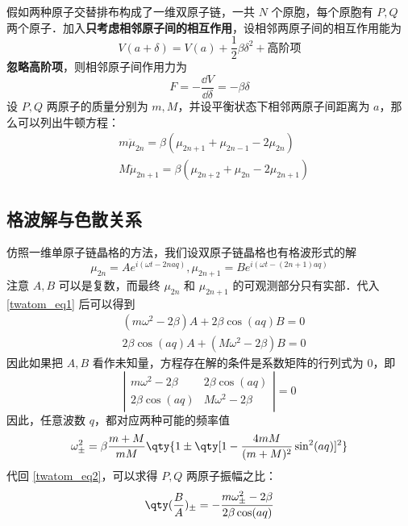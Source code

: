 
假如两种原子交替排布构成了一维双原子链，一共 $N$ 个原胞，每个原胞有 $P,Q$ 两个原子．加入\textbf{只考虑相邻原子间的相互作用}，设相邻两原子间的相互作用能为
\begin{equation}
V(a+\delta)=V(a)+\frac{1}{2}\beta \delta^2+\text{高阶项}
\end{equation}
\textbf{忽略高阶项}，则相邻原子间作用力为
\begin{equation}
F=-\frac{\dd V}{\dd \delta}=-\beta \delta
\end{equation}
设 $P,Q$ 两原子的质量分别为 $m,M$，并设平衡状态下相邻两原子间距离为 $a$，那么可以列出牛顿方程：
\begin{equation}\label{twatom_eq1}
\begin{aligned}
&m\ddot \mu_{2n}=\beta(\mu_{2n+1}+\mu_{2n-1}-2\mu_{2n})\\
&M\ddot \mu_{2n+1}=\beta(\mu_{2n+2}+\mu_{2n}-2\mu_{2n+1})
\end{aligned}
\end{equation}
\subsection{格波解与色散关系}
仿照一维单原子链晶格的方法，我们设双原子链晶格也有格波形式的解
\begin{equation}\label{twatom_eq3}
\mu_{2n}=A e^{i(\omega t - 2naq)},\mu_{2n+1}=B  e^{i(\omega t - (2n+1)aq)}
\end{equation}
注意 $A,B$ 可以是复数，而最终 $\mu_{2n}$ 和 $\mu_{2n+1}$ 的可观测部分只有实部．代入\autoref{twatom_eq1} 后可以得到
\begin{equation}\label{twatom_eq2}
\begin{aligned}
&(m\omega^2-2\beta)A+2\beta\cos(aq)B=0\\
&2\beta\cos(aq)A+(M\omega^2-2\beta)B=0
\end{aligned}
\end{equation}
因此如果把 $A,B$ 看作未知量，方程存在解的条件是系数矩阵的行列式为 $0$，即
\begin{equation}
\left|
\begin{matrix}
m\omega^2-2\beta&2\beta\cos(aq)\\
2\beta\cos(aq)&M\omega^2-2\beta
\end{matrix}
\right|=0
\end{equation}
因此，任意波数 $q$，都对应两种可能的频率值
\begin{equation}
\omega_{\pm}^2=\beta\frac{m+M}{mM}\qty{1\pm \qty[1-\frac{4mM}{(m+M)^2}\sin^2(aq)]^2}
\end{equation}
代回 \autoref{twatom_eq2}，可以求得 $P,Q$ 两原子振幅之比：
\begin{equation}\label{twatom_eq4}
\qty(\frac{B}{A})_{\pm}=-\frac{m\omega_{\pm}^2-2\beta}{2\beta\cos(aq)}
\end{equation}

